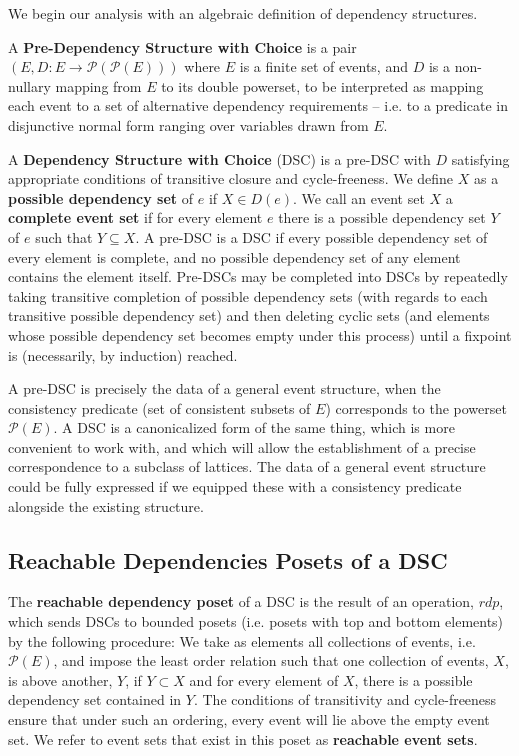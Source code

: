 \documentclass[a4paper,USenglish,cleveref, autoref, thm-restate,authorcolumns]{lipics-v2019}
\newcommand{\Pc}{\mathcal{P}}
\begin{document}
We begin our analysis with an algebraic definition of dependency structures.

\begin{definition}
A \textbf{Pre-Dependency Structure with Choice} is a pair \((E, D : E \rightarrow \Pc(\Pc(E)))\) where \(E\) is a finite set of events, and \(D\) is a non-nullary mapping from \(E\) to its double powerset, to be interpreted as mapping each event to a set of alternative dependency requirements -- i.e. to a predicate in disjunctive normal form ranging over variables drawn from \(E\).
\end{definition}

\begin{definition}
A \textbf{Dependency Structure with Choice} (DSC) is a pre-DSC with \(D\) satisfying  appropriate conditions of transitive closure and cycle-freeness. We define \(X\) as a \textbf{possible dependency set} of \(e\) if \(X \in D(e)\). We call an event set \(X\) a \textbf{complete event set} if for every element \(e\) there is a possible dependency set \(Y\) of \(e\) such that \(Y \subseteq X\). A pre-DSC is a DSC if every possible dependency set of every element is complete, and no possible dependency set of any element contains the element itself. Pre-DSCs may be completed into DSCs by repeatedly taking transitive completion of possible dependency sets (with regards to each transitive possible dependency set) and then deleting cyclic sets (and elements whose possible dependency set becomes empty under this process) until a fixpoint is (necessarily, by induction) reached.
\end{definition}

A pre-DSC is precisely the data of a general event structure, when the consistency predicate (set of consistent subsets of \(E\)) corresponds to the powerset \(\Pc(E)\). A DSC is a canonicalized form of the same thing, which is more convenient to work with, and which will allow the establishment of a precise correspondence to a subclass of lattices. The data of a general event structure could be fully expressed if we equipped these with a consistency predicate alongside the existing structure.

\subsection{Reachable Dependencies Posets of a DSC}

\begin{definition} The \textbf{reachable dependency poset} of a DSC is the result of an operation, \(rdp\), which sends DSCs to bounded posets (i.e. posets with top and bottom elements) by the following procedure:  We take as elements all collections of events, i.e. \(\Pc(E)\), and impose the least order relation such that one collection of events, \(X\), is above another, \(Y\), if \(Y \subset X\) and for every element of \(X\), there is a possible dependency set contained in \(Y\).  The conditions of transitivity and cycle-freeness ensure that under such an ordering, every event will lie above the empty event set. We refer to event sets that exist in this poset as \textbf{reachable event sets}.
\end{definition}
\end{document}
